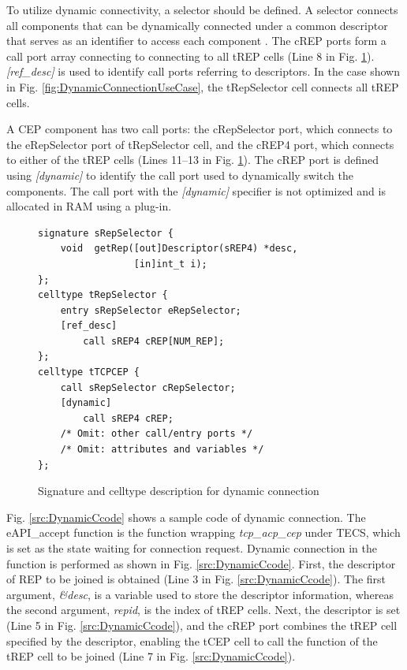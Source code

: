 \documentclass[conference]{IEEEtran/IEEEtran}
\begin{document}
To utilize dynamic connectivity, a selector should be defined.
A selector connects all components that can be dynamically connected under a common descriptor that serves as an identifier to access each component \cite{par:optimization}.
The cREP ports form a call port array connecting to connecting to all tREP cells (Line 8 in Fig. \ref{src:DynamicCDLcode}).
{\it [ref\_desc]} is used to identify call ports referring to descriptors. 
In the case shown in Fig. \ref{fig:DynamicConnectionUseCase}, the tRepSelector cell connects all tREP cells.

A CEP component has two call ports: the cRepSelector port, which connects to the eRepSelector port of tRepSelector cell, and the cREP4 port, which connects to either of the tREP cells (Lines 11--13 in Fig. \ref{src:DynamicCDLcode}).
The cREP port is defined using {\it [dynamic]} to identify the call port used to dynamically switch the components.
The call port with the {\it [dynamic]} specifier is not optimized and is allocated in RAM using a plug-in.

\begin{figure}[t]
\centering
\begin{lstlisting}
signature sRepSelector {
    void  getRep([out]Descriptor(sREP4) *desc,
                 [in]int_t i);
};
celltype tRepSelector {
    entry sRepSelector eRepSelector;
    [ref_desc]
        call sREP4 cREP[NUM_REP];
};
celltype tTCPCEP {
    call sRepSelector cRepSelector;
    [dynamic]
        call sREP4 cREP;
    /* Omit: other call/entry ports */
    /* Omit: attributes and variables */
};
\end{lstlisting}
\vspace{-1mm} \caption{Signature and celltype description for dynamic connection}
\vspace{-1mm} \label{src:DynamicCDLcode}
\end{figure}

Fig. \ref{src:DynamicCcode} shows a sample code of dynamic connection.
The eAPI\_accept function is the function wrapping {\it tcp\_acp\_cep} under TECS, which is set as the state waiting for connection request.
Dynamic connection in the function is performed as shown in Fig. \ref{src:DynamicCcode}.
First, the descriptor of REP to be joined is obtained (Line 3 in Fig. \ref{src:DynamicCcode}).
The first argument, {\it \&desc}, is a variable used to store the descriptor information, whereas the second argument, {\it repid}, is the index of tREP cells.
Next, the descriptor is set (Line 5 in Fig. \ref{src:DynamicCcode}), and the cREP port combines the tREP cell specified by the descriptor, enabling the tCEP cell to call the function of the tREP cell to be joined (Line 7 in Fig. \ref{src:DynamicCcode}).
\end{document}
